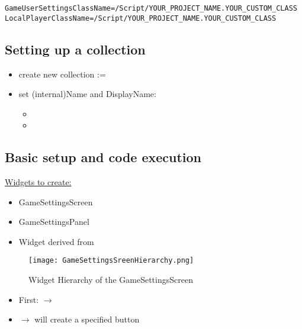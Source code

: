 \begin{lstlisting}
GameUserSettingsClassName=/Script/YOUR_PROJECT_NAME.YOUR_CUSTOM_CLASS
LocalPlayerClassName=/Script/YOUR_PROJECT_NAME.YOUR_CUSTOM_CLASS
\end{lstlisting}
        
        \subsection{Setting up a collection}
            \begin{itemize}
                \item create new collection := 
                \item set (internal)Name and DisplayName:
                \begin{itemize}
                    \item {}
                    \item {}
                \end{itemize}
            \end{itemize}
        
        
        \subsection{Basic setup and code execution}
            \uline{Widgets to create:}
            \begin{itemize}
                \item GameSettingsScreen
                \item GameSettingsPanel
                \item Widget derived from 
            \end{itemize}
        
            \begin{figure}
                \texttt{[image: GameSettingsSreenHierarchy.png]}
                \caption{Widget Hierarchy of the GameSettingsScreen}
                \label{}
            \end{figure}

            \begin{itemize}
                \item First:  $\rightarrow$ 
                \item {} $\rightarrow$ will create a specified button 
            \end{itemize}
            
